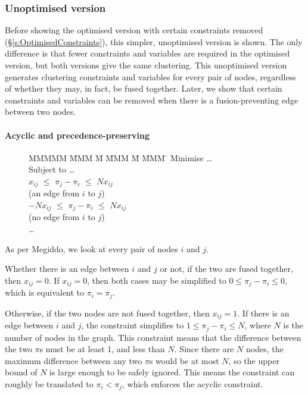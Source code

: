 \subsubsection{Unoptimised version}
Before showing the optimised version with certain constraints removed (\S\ref{s:OptimisedConstraints}), this simpler, unoptimised version is shown.
The only difference is that fewer constraints and variables are required in the optimised version, but both versions give the same clustering.
This unoptimised version generates clustering constraints and variables for every pair of nodes, regardless of whether they may, in fact, be fused together.
Later, we show that certain constraints and variables can be removed when there is a fusion-preventing edge between two nodes.


\paragraph{Acyclic and precedence-preserving}

\begin{figure}[H]
\begin{tabbing}
MMMMM   \= MMM \= M \= MMM \= M \= MMM \= \kill
Minimise   \> \ldots \\
Subject to \> \ldots \\
           \>    $x_{ij}$ \> $\le$ \> $\pi_j - \pi_i$ \> $\le$ \> $N x_{ij}$ \\
           \>             (an edge from $i$ to $j$)            \\
           \> $-N x_{ij}$ \> $\le$ \> $\pi_j - \pi_i$ \> $\le$ \> $N x_{ij}$ \\
           \>             (no edge from $i$ to $j$)            \\
           \> \ldots
\end{tabbing}
\end{figure}
As per Megiddo\cite{megiddo1998optimal}, we look at every pair of nodes $i$ and $j$.

Whether there is an edge between $i$ and $j$ or not, if the two are fused together, then $x_{ij} = 0$. If $x_{ij} = 0$, then both cases may be simplified to $0 \le \pi_j - \pi_i \le 0$, which is equivalent to $\pi_i = \pi_j$. 

Otherwise, if the two nodes are not fused together, then $x_{ij} = 1$. If there is an edge between $i$ and $j$, the constraint simplifies to $1 \le \pi_j - \pi_i \le N$, where $N$ is the number of nodes in the graph. This constraint means that the difference between the two $\pi$s must be at least 1, and less than $N$. Since there are $N$ nodes, the maximum difference between any two $\pi$s would be at most $N$, so the upper bound of $N$ is large enough to be safely ignored. This means the constraint can roughly be translated to $\pi_i < \pi_j$, which enforces the acyclic constraint.

